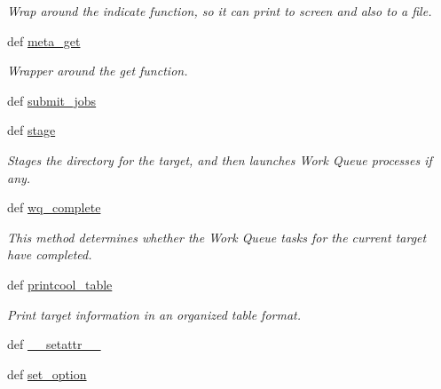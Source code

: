 \begin{DoxyCompactItemize}
\begin{DoxyCompactList}\small\item\em Wrap around the indicate function, so it can print to screen and also to a file. \end{DoxyCompactList}\item 
def \hyperlink{classforcebalance_1_1target_1_1Target_a17c8ac0c7dd0a0430accddfd12602103}{meta\-\_\-get}
\begin{DoxyCompactList}\small\item\em Wrapper around the get function. \end{DoxyCompactList}\item 
def \hyperlink{classforcebalance_1_1target_1_1Target_a78cd29b94cbcc201eed99c78aaef46a4}{submit\-\_\-jobs}
\item 
def \hyperlink{classforcebalance_1_1target_1_1Target_af8d2a4658c87841e40296795aec478bb}{stage}
\begin{DoxyCompactList}\small\item\em Stages the directory for the target, and then launches Work Queue processes if any. \end{DoxyCompactList}\item 
def \hyperlink{classforcebalance_1_1target_1_1Target_af6099ec09486213869dba2491bd8ea04}{wq\-\_\-complete}
\begin{DoxyCompactList}\small\item\em This method determines whether the Work Queue tasks for the current target have completed. \end{DoxyCompactList}\item 
def \hyperlink{classforcebalance_1_1target_1_1Target_ac30a4e9d7d9fe06f7caefa5f7cfab09b}{printcool\-\_\-table}
\begin{DoxyCompactList}\small\item\em Print target information in an organized table format. \end{DoxyCompactList}\item 
def \hyperlink{classforcebalance_1_1BaseClass_a0c851d413c3b2f30561b72a46771bcff}{\-\_\-\-\_\-setattr\-\_\-\-\_\-}
\item 
def \hyperlink{classforcebalance_1_1BaseClass_a73e9a37a7632e79eb99f49bd15aced45}{set\-\_\-option}
\end{DoxyCompactItemize}
